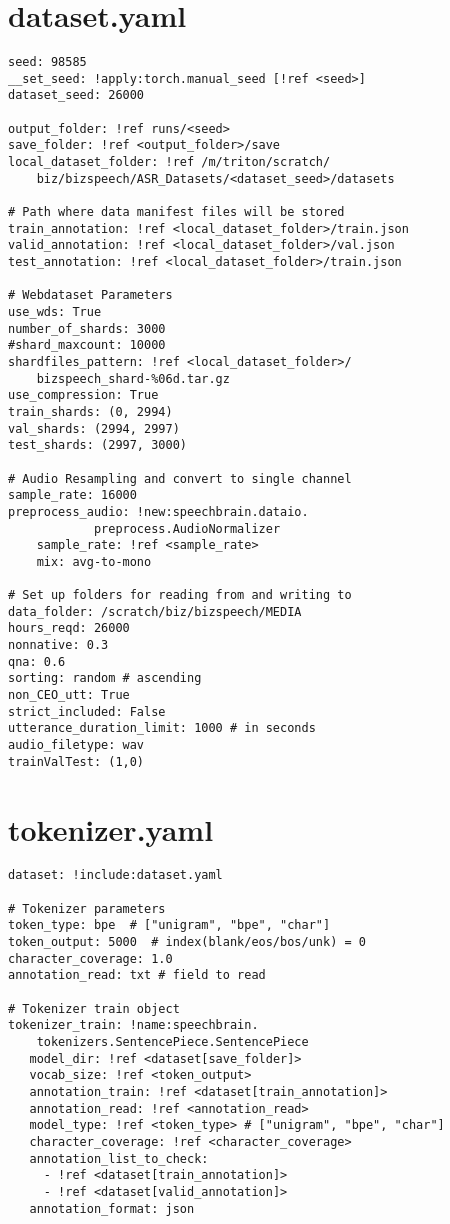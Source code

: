 \section*{dataset.yaml}
\begin{verbatim}
seed: 98585
__set_seed: !apply:torch.manual_seed [!ref <seed>]
dataset_seed: 26000

output_folder: !ref runs/<seed>
save_folder: !ref <output_folder>/save
local_dataset_folder: !ref /m/triton/scratch/
    biz/bizspeech/ASR_Datasets/<dataset_seed>/datasets 

# Path where data manifest files will be stored
train_annotation: !ref <local_dataset_folder>/train.json
valid_annotation: !ref <local_dataset_folder>/val.json
test_annotation: !ref <local_dataset_folder>/train.json

# Webdataset Parameters
use_wds: True
number_of_shards: 3000
#shard_maxcount: 10000
shardfiles_pattern: !ref <local_dataset_folder>/
    bizspeech_shard-%06d.tar.gz
use_compression: True
train_shards: (0, 2994)
val_shards: (2994, 2997)
test_shards: (2997, 3000)

# Audio Resampling and convert to single channel
sample_rate: 16000
preprocess_audio: !new:speechbrain.dataio.
            preprocess.AudioNormalizer
    sample_rate: !ref <sample_rate>
    mix: avg-to-mono

# Set up folders for reading from and writing to
data_folder: /scratch/biz/bizspeech/MEDIA 
hours_reqd: 26000
nonnative: 0.3
qna: 0.6
sorting: random # ascending
non_CEO_utt: True
strict_included: False
utterance_duration_limit: 1000 # in seconds
audio_filetype: wav
trainValTest: (1,0)
\end{verbatim}

\section*{tokenizer.yaml}
\begin{verbatim}
dataset: !include:dataset.yaml

# Tokenizer parameters
token_type: bpe  # ["unigram", "bpe", "char"]
token_output: 5000  # index(blank/eos/bos/unk) = 0
character_coverage: 1.0
annotation_read: txt # field to read

# Tokenizer train object
tokenizer_train: !name:speechbrain.
    tokenizers.SentencePiece.SentencePiece
   model_dir: !ref <dataset[save_folder]>
   vocab_size: !ref <token_output>
   annotation_train: !ref <dataset[train_annotation]>
   annotation_read: !ref <annotation_read>
   model_type: !ref <token_type> # ["unigram", "bpe", "char"]
   character_coverage: !ref <character_coverage>
   annotation_list_to_check:
     - !ref <dataset[train_annotation]>
     - !ref <dataset[valid_annotation]>
   annotation_format: json
   
\end{verbatim}

